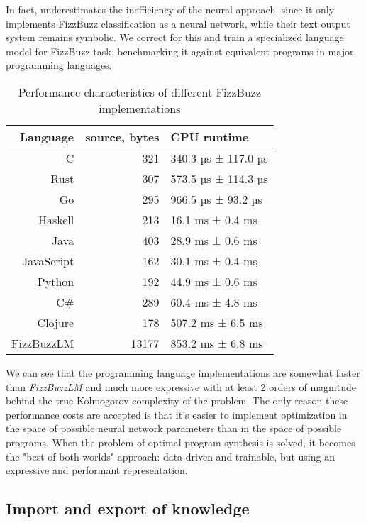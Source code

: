 In fact, \cite{JoelGrusFizz} underestimates the inefficiency of the neural approach, since it only implements FizzBuzz \cite{reesFizzBuzz1012002} classification as a neural network, while their text output system remains symbolic.
We correct for this and train a specialized language model for FizzBuzz task, benchmarking it against equivalent programs in major programming languages.

\begin{table}[H]
    \centering
    \begin{tabular}{r|r|l}
         Language & source, bytes & CPU runtime \\
         \midrule
         C & 321 & 340.3 µs ± 117.0 µs \\
         Rust & 307 & 573.5 µs ± 114.3 µs \\
         Go & 295 & 966.5 µs ±  93.2 µs \\
         Haskell & 213 & 16.1 ms ± 0.4 ms \\
         Java & 403 & 28.9 ms ± 0.6 ms \\
         JavaScript & 162 & 30.1 ms ± 0.4 ms \\
         Python & 192 & 44.9 ms ± 0.6 ms \\
         C\# & 289 & 60.4 ms ± 4.8 ms \\
         Clojure & 178 & 507.2 ms ± 6.5 ms \\
         FizzBuzzLM & 13177 & 853.2 ms ± 6.8 ms
    \end{tabular}
    \caption{Performance characteristics of different FizzBuzz implementations}
    \label{tab:my_label}
\end{table}

We can see that the programming language implementations are somewhat faster than \emph{FizzBuzzLM} and much more expressive with at least 2 orders of magnitude behind the true Kolmogorov complexity \cite{kolmogorov} of the problem.
The only reason these performance costs are accepted is that it's easier to implement optimization in the space of possible neural network parameters than in the space of possible programs. 
When the problem of optimal program synthesis is solved, it becomes the "best of both worlds" approach: data-driven and trainable, but using an expressive and performant representation.
 
\subsection{Import and export of knowledge}
\label{sec:importexport}

